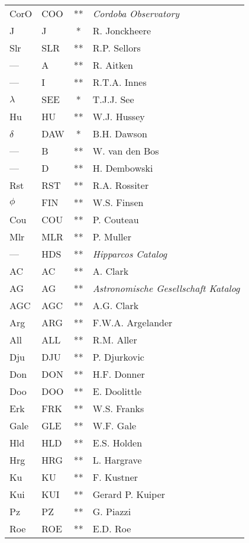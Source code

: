 \begin{longtable}{l|l|c|p{80mm}}
CorO	   	     	& COO 	& ** & \emph{Cordoba Observatory} \\
J   	        	& J   	& *  & R. Jonckheere \\
Slr   	        	& SLR 	& ** & R.P. Sellors \\
---		        	& A   	& ** & R. Aitken \\
---   	        	& I   	& ** & R.T.A. Innes \\
$\lambda$   	    & SEE 	& *  & T.J.J. See \\
Hu   	        	& HU  	& ** & W.J. Hussey \\
$\delta$			& DAW 	& *  & B.H. Dawson \\
---		        	& B   	& ** & W. van den Bos \\
---		        	& D   	& ** & H. Dembowski  \\
Rst   	    	    & RST 	& ** & R.A. Rossiter \\
$\phi$		    	& FIN 	& ** & W.S. Finsen \\
Cou 	        	& COU 	& ** & P. Couteau \\
Mlr					& MLR	& ** & P. Muller \\
---		        	& HDS  	& ** & \emph{Hipparcos Catalog} \\
AC		        	& AC  	& ** & A. Clark \\
AG		        	& AG  	& ** & \emph{Astronomische Gesellschaft Katalog} \\
AGC		        	& AGC 	& ** & A.G. Clark \\
Arg		        	& ARG 	& ** & F.W.A. Argelander \\
All		        	& ALL 	& ** & R.M. Aller \\
Dju  	        	& DJU 	& ** & P. Djurkovic \\
Don  	        	& DON 	& ** & H.F. Donner \\
Doo  	        	& DOO 	& ** & E. Doolittle \\
Erk  	   			& FRK 	& ** & W.S. Franks \\
Gale  	    	    & GLE 	& ** & W.F. Gale \\
Hld   	        	& HLD 	& ** & E.S. Holden \\
Hrg   		        & HRG 	& ** & L. Hargrave \\
Ku  		        & KU  	& ** & F. Kustner \\
Kui  	        	& KUI 	& ** & Gerard P. Kuiper \\
Pz  	 	        & PZ  	& ** & G. Piazzi \\
Roe   	        	& ROE 	& ** & E.D. Roe \\

\end{longtable}
